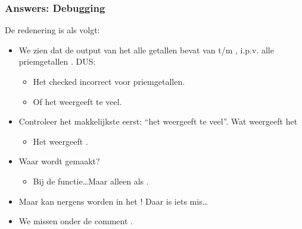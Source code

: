 \begin{frame}
\frametitle{Answers: Debugging}

De redenering is als volgt:
\begin{itemize}
  \item We zien dat de output van het  alle getallen bevat van  t/m , i.p.v. alle priemgetallen . DUS:
  \begin{itemize}
  	\item Het  checked incorrect voor priemgetallen.
  	\item Of het weergeeft te veel.
  \end{itemize}
  \item Controleer het makkelijkste eerst: ``het weergeeft te veel''. Wat weergeeft het 
  \begin{itemize}
    \item Het weergeeft .
  \end{itemize}
  \item Waar wordt  gemaakt?
  \begin{itemize}
    \item Bij de  functie\ldots Maar alleen als .
  \end{itemize}
  \item Maar  kan nergens  worden in het ! Daar is iets mis\ldots
  \item We missen  onder de comment .
\end{itemize}

\end{frame}




